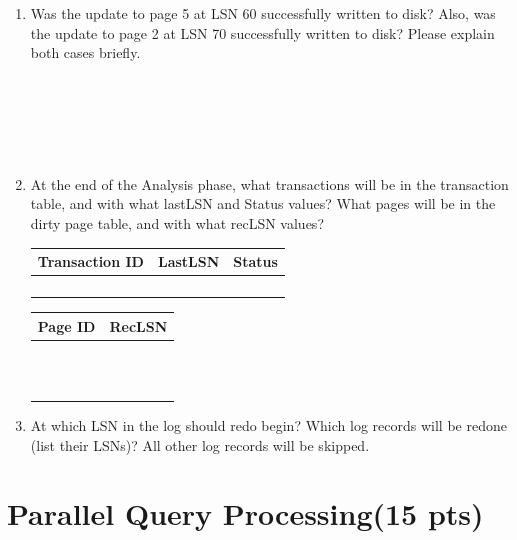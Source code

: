 \documentclass[paper=a4, fontsize=11pt]{scrartcl}
\numberwithin{equation}{section}		%
\numberwithin{figure}{section}			%
\numberwithin{table}{section}				%
\begin{document}
\begin{enumerate}
    \item Was the update to page 5 at LSN 60 successfully written to disk? Also, was the update to page 2 at LSN 70 successfully written to disk? Please explain both cases briefly.\\
    \\
    \\
    \\
    \\
    \\
    \item At the end of the Analysis phase, what transactions will be in the transaction table, and with what lastLSN and Status values? What pages will be in the dirty page table, and with what recLSN values?
\begin{table}[h]
\centering
    \begin{subtable}
    \begin{tabular}{|c|c|c|}
    \hline
    \textbf{Transaction ID} & \textbf{LastLSN} & \textbf{Status} \\ \hline
    & & \\ \hline
    & & \\ \hline
    & & \\ \hline
    & & \\ \hline
    \end{tabular}
    \label{sample-1}
    \end{subtable}
    \qquad
    \begin{subtable}
    \begin{tabular}{|c|c|}
    \hline
    \textbf{Page ID} & \textbf{RecLSN} \\ \hline
     &  \\ \hline
     &  \\ \hline
    ~ & ~ \\ \hline
    ~ & ~ \\ \hline
    \end{tabular}      
    \label{tab:secondtable}
    \end{subtable}
\end{table}
\item At which LSN in the log should redo begin? Which log records will be redone (list their LSNs)? All other log
records will be skipped.

\end{enumerate}


\section{Parallel Query Processing(15 pts)}
\end{document}
